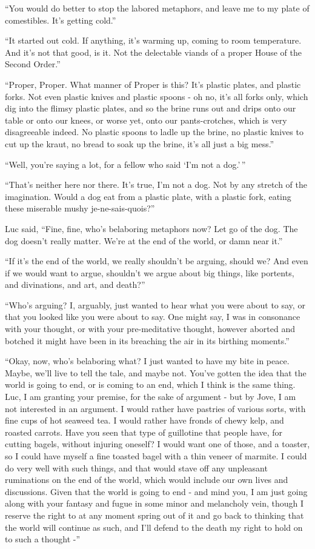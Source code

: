 ``You would do better to stop the labored metaphors, and leave me to my
plate of comestibles. It's getting cold.''

``It started out cold. If anything, it's warming up, coming to room
temperature. And it's not that good, is it. Not the delectable viands of
a proper House of the Second Order.''

``Proper, Proper. What manner of Proper is this? It's plastic plates,
and plastic forks. Not even plastic knives and plastic spoons - oh no,
it's all forks only, which dig into the flimsy plastic plates, and so
the brine runs out and drips onto our table or onto our knees, or worse
yet, onto our pants-crotches, which is very disagreeable indeed. No
plastic spoons to ladle up the brine, no plastic knives to cut up the
kraut, no bread to soak up the brine, it's all just a big mess.''

``Well, you're saying a lot, for a fellow who said `I'm not a dog.'\,''

``That's neither here nor there. It's true, I'm not a dog. Not by any
stretch of the imagination. Would a dog eat from a plastic plate, with a
plastic fork, eating these miserable mushy je-ne-sais-quois?''

Luc said, ``Fine, fine, who's belaboring metaphors now? Let go of the
dog. The dog doesn't really matter. We're at the end of the world, or
damn near it.''

``If it's the end of the world, we really shouldn't be arguing, should
we? And even if we would want to argue, shouldn't we argue about big
things, like portents, and divinations, and art, and death?''

``Who's arguing? I, arguably, just wanted to hear what you were about to
say, or that you looked like you were about to say. One might say, I was
in consonance with your thought, or with your pre-meditative thought,
however aborted and botched it might have been in its breaching the air
in its birthing moments.''

``Okay, now, who's belaboring what? I just wanted to have my bite in
peace. Maybe, we'll live to tell the tale, and maybe not. You've gotten
the idea that the world is going to end, or is coming to an end, which I
think is the same thing. Luc, I am granting your premise, for the sake
of argument - but by Jove, I am not interested in an argument. I would
rather have pastries of various sorts, with fine cups of hot seaweed
tea. I would rather have fronds of chewy kelp, and roasted carrots. Have
you seen that type of guillotine that people have, for cutting bagels,
without injuring oneself? I would want one of those, and a toaster, so I
could have myself a fine toasted bagel with a thin veneer of marmite. I
could do very well with such things, and that would stave off any
unpleasant ruminations on the end of the world, which would include our
own lives and discussions. Given that the world is going to end - and
mind you, I am just going along with your fantasy and fugue in some
minor and melancholy vein, though I reserve the right to at any moment
spring out of it and go back to thinking that the world will continue as
such, and I'll defend to the death my right to hold on to such a thought
-''

